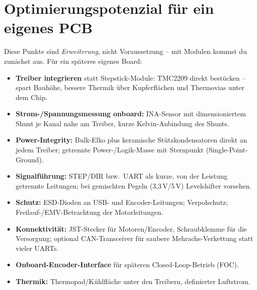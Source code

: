 
\chapter{Optimierungspotenzial für ein eigenes PCB}

Diese Punkte sind \emph{Erweiterung}, nicht Voraussetzung -- mit Modulen kommst
du zunächst aus. Für ein späteres eigenes Board:
\begin{itemize}
\item \textbf{Treiber integrieren} statt Stepstick-Module: TMC2209 direkt
  bestücken -- spart Bauhöhe, bessere Thermik über Kupferflächen und Thermovias
  unter dem Chip.
\item \textbf{Strom-/Spannungsmessung onboard:} INA-Sensor mit dimensioniertem
  Shunt je Kanal nahe am Treiber, kurze Kelvin-Anbindung des Shunts.
\item \textbf{Power-Integrity:} Bulk-Elko plus keramische Stützkondensatoren
  direkt an jedem Treiber; getrennte Power-/Logik-Masse mit Sternpunkt
  (Single-Point-Ground).
\item \textbf{Signalführung:} STEP/DIR bzw.\ UART als kurze, von der Leistung
  getrennte Leitungen; bei gemischten Pegeln (3{,}3\,V/5\,V) Levelshifter
  vorsehen.
\item \textbf{Schutz:} ESD-Dioden an USB- und Encoder-Leitungen; Verpolschutz;
  Freilauf-/EMV-Betrachtung der Motorleitungen.
\item \textbf{Konnektivität:} JST-Stecker für Motoren/Encoder, Schraubklemme
  für die Versorgung; optional CAN-Transceiver für saubere
  Mehrachs-Verkettung statt vieler UARTs.
\item \textbf{Onboard-Encoder-Interface} für späteren Closed-Loop-Betrieb (FOC).
\item \textbf{Thermik:} Thermopad/Kühlfläche unter den Treibern, definierter
  Luftstrom.
\end{itemize}

